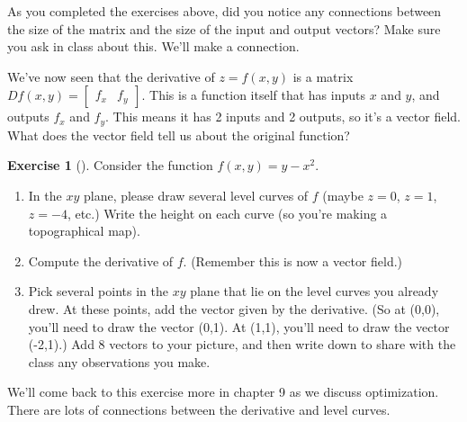 \documentclass[10pt,]{book}
\theoremstyle{plain}
\theoremstyle{definition}
\theoremstyle{definition}
\theoremstyle{definition}
\theoremstyle{definition}
\newtheorem{exploration}[project]{Exercise}
\theoremstyle{definition}
\numberwithin{equation}{section}
\newcommand{\amp}{&}
\begin{document}
As you completed the exercises above, did you notice any connections between the size of the matrix and the size of the input and output vectors? Make sure you ask in class about this. We'll make a connection.%
\par
We've now seen that the derivative of \(z=f(x,y)\) is a matrix \(Df(x,y) = \begin{bmatrix}f_x \amp  f_y
\end{bmatrix}\). This is a function itself that has inputs \(x\) and \(y\), and outputs \(f_x\) and \(f_y\). This means it has 2 inputs and 2 outputs, so it's a vector field. What does the vector field tell us about the original function?%
\begin{exploration}[]\label{exploration-138}
Consider the function \(f(x,y)=y-x^2\).%
\begin{enumerate}[font=\bfseries,label=(\alph*),ref=\alph*]
\item\label{task-287} In the \(xy\) plane, please draw several level curves of \(f\) (maybe \(z=0\), \(z=1\), \(z=-4\), etc.)  Write the height on each curve (so you're making a topographical map).%
\item\label{task-288} Compute the derivative of \(f\). (Remember this is now a vector field.)%
\item\label{task-289} Pick several points in the \(xy\) plane that lie on the level curves you already drew.  At these points, add the vector given by the derivative.  (So at (0,0), you'll need to draw the vector (0,1).  At (1,1), you'll need to draw the vector (-2,1).) Add 8 vectors to your picture, and then write down to share with the class any observations you make.%
\end{enumerate}
\end{exploration}
We'll come back to this exercise more in chapter 9 as we discuss optimization. There are lots of connections between the derivative and level curves.%
\typeout{************************************************}
\typeout{************************************************}
\end{document}
